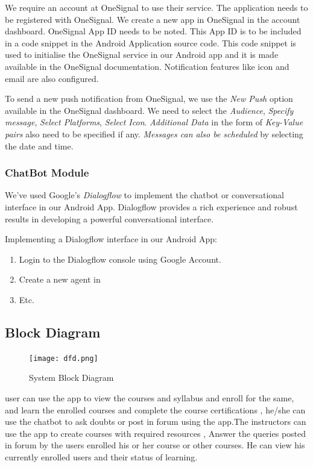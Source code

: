 We require an account at OneSignal to use their service. The application needs to be registered with OneSignal. We create a new app in OneSignal in the account dashboard. OneSignal App ID needs to be noted. This App ID is to be included in a code snippet in the Android Application source code. This code snippet is used to initialise the OneSignal service in our Android app and it is made available in the OneSignal documentation. Notification features like icon and email are also configured.

To send a new push notification from OneSignal, we use the {\em New Push} option available in the OneSignal dashboard. We need to select the {\em Audience}, {\em Specify message}, {\em Select Platforms}, {\em Select Icon}. {\em Additional Data} in the form of {\em Key-Value pairs} also need to be specified if any. {\em Messages can also be scheduled} by selecting the date and time.

\subsubsection{ChatBot Module}
We've used Google's {\em Dialogflow} to implement the chatbot or conversational interface in our Android App. Dialogflow provides a rich experience and robust results in developing a powerful conversational interface.

Implementing a Dialogflow interface in our Android App:
\begin{enumerate}
  \item Login to the Dialogflow console using Google Account.
  \item Create a new agent in 
  \item Etc.
\end{enumerate}

\subsection{Block Diagram}
\begin{figure}[h]
	\label{ss}    %
	\centering
	\texttt{[image: dfd.png]}
	\caption{System Block Diagram}
\end{figure}



user can use the app to view the courses and syllabus and enroll for the same, and learn the enrolled courses and complete the course certifications , he/she can use the chatbot to ask doubts or post in forum using the app.The instructors can use the app to create courses with required resources , Answer the queries posted in forum by the users enrolled his or her course or other courses. He can view his currently enrolled users and their status of learning.





